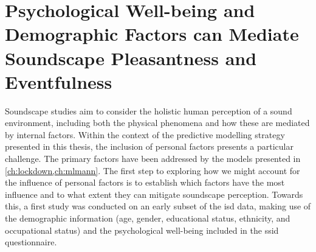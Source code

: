 \chapter{Psychological Well-being and Demographic Factors can Mediate Soundscape Pleasantness and Eventfulness}
\label{ch:whostudy}


Soundscape studies aim to consider the holistic human perception of a sound environment, including both the physical phenomena and how these are mediated by internal factors. Within the context of the predictive modelling strategy presented in this thesis, the inclusion of personal factors presents a particular challenge. The primary factors have been addressed by the models presented in \cref{ch:lockdown,ch:mlmann}. The first step to exploring how we might account for the influence of personal factors is to establish which factors have the most influence and to what extent they can mitigate soundscape perception. Towards this, a first study was conducted on an early subset of the \gls{isd} data, making use of the demographic information (age, gender, educational status, ethnicity, and occupational status) and the psychological well-being included in the \gls{ssid} questionnaire.

